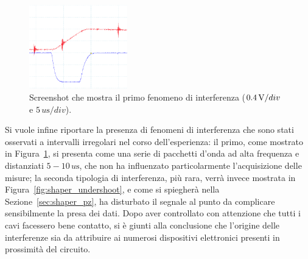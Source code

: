 \begin{figure}
  \centering
  \includegraphics[width=0.38\textwidth]{../preamp/images/screen_interferenza1}
  \caption{\footnotesize Screenshot che mostra il primo fenomeno di interferenza ($0.4\,\si{\volt}/div$ e $5\,\si{u\s}/div$).}\label{fig:preamp_interferenza1}%
  \vspace{-35pt} %
\end{figure}
\noindent Si vuole infine riportare la presenza di fenomeni di interferenza che sono stati osservati a intervalli irregolari nel corso dell'esperienza: il primo, come mostrato
in Figura~\ref{fig:preamp_interferenza1}, si presenta come una serie di pacchetti d'onda ad alta frequenza
e distanziati $5-10 \,\si{u\s}$, che non ha influenzato particolarmente l'acquisizione
delle misure; la seconda tipologia di interferenza, più rara, verrà invece mostrata in Figura~\ref{fig:shaper_undershoot}, e come si spiegherà nella Sezione~\ref{sec:shaper_pz}, ha disturbato il
segnale al punto da complicare sensibilmente la presa dei dati. Dopo aver controllato con attenzione che tutti i cavi facessero bene contatto, si è giunti alla conclusione che l'origine delle interferenze sia da attribuire ai numerosi dispositivi elettronici presenti
in prossimità del circuito.

